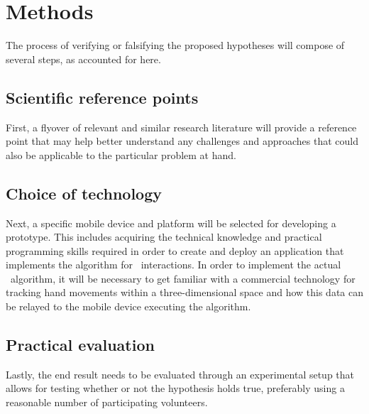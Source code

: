 \section{Methods}
The process of verifying or falsifying the proposed hypotheses will compose of several steps, as accounted for here. 

\subsection{Scientific reference points}

First, a flyover of relevant and similar research literature will provide a reference point that may help better understand any challenges and approaches that could also be applicable to the particular problem at hand.

\subsection{Choice of technology}

Next, a specific mobile device and platform will be selected for developing a prototype. This includes acquiring the technical knowledge and practical programming skills required in order to create and deploy an application that implements the algorithm for \AirSwipe\ interactions. In order to implement the actual \AirSwipe\ algorithm, it will be necessary to get familiar with a commercial technology for tracking hand movements within a three-dimensional space and how this data can be relayed to the mobile device executing the algorithm.  

\subsection{Practical evaluation}

Lastly, the end result needs to be evaluated through an experimental setup that allows for testing whether or not the hypothesis holds true, preferably using a reasonable number of participating volunteers. 


\begin{comment}

\section{Expected analysis and results}

It is expected that the experiment will provide insight into whether or not interaction in off-screen space improves the user experience, given the particular approach taken. In addition, an analysis of how participants perceive and interact with the off-screen space through \AirSwipe\ gestures may lead to a subsequent exploration of a sub-hypothesis and possible refinement of the prototype. For instance, whether or not off-screen space, when implemented on a small portable device, correlates perfectly well with a simple imaginary extension of the display plane is an open question - one that is best explored through careful analysis of experimental data generated by actual human behavior. 

\end{comment}

